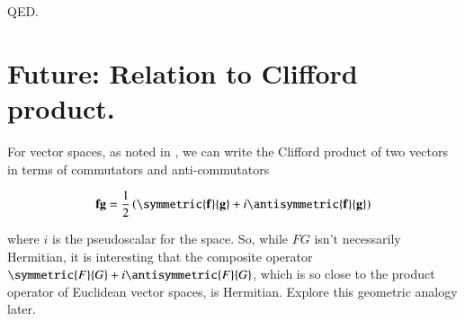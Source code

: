 QED.

\section{Future: Relation to Clifford product. }

For vector spaces, as noted in \cite{PJpauliMatrix},
we can write the Clifford product of two  vectors in terms of commutators and anti-commutators

\begin{align*}
\Bf \Bg = \inv{2} \left( \symmetric{\Bf}{\Bg} + i \antisymmetric{\Bf}{\Bg} \right)
\end{align*}

where $i$ is the pseudoscalar for the space.  So, while $FG$ isn't necessarily Hermitian, it is interesting that the composite operator
$\symmetric{F}{G} + i \antisymmetric{F}{G}$, which is so close to the product operator of Euclidean vector spaces, is Hermitian.
Explore this geometric analogy later.

%
%

%
